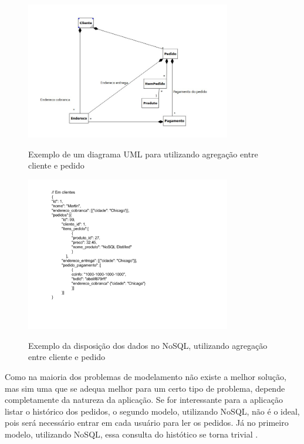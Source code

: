\begin{figure}[!htb]
    \centering
    \caption{Exemplo de um diagrama \ac{UML} para utilizando agregação entre cliente e pedido}
    \includegraphics[width=0.8\textwidth]{./04-figuras/diagrama_no_sql_uml_duplo.jpg}
    \label{fig:diagrama_sql_uml}
\end{figure}
\begin{figure}[!htb]
    \centering
    \caption{Exemplo da disposição dos dados no NoSQL, utilizando agregação entre cliente e pedido}
    \includegraphics[width=0.8\textwidth]{./04-figuras/disposicao_json_duplo.png}
    \label{fig:disposicao_tabela}
\end{figure}

Como na maioria dos problemas de modelamento não existe a melhor solução, mas sim uma que se adequa melhor para um certo tipo de problema, depende completamente da natureza da aplicação. Se for interessante para a aplicação listar o histórico dos pedidos, o segundo modelo, utilizando NoSQL, não é o ideal, pois será necessário entrar em cada usuário para ler os pedidos. Já no primeiro modelo, utilizando NoSQL, essa consulta do histótico se torna trivial \cite{NoSQL}.

